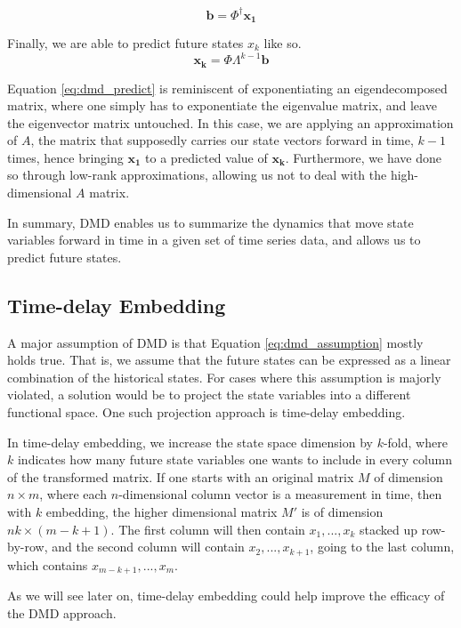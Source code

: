 \documentclass[letterpaper, 10 pt, conference]{ieeeconf}  %
\begin{document}
\begin{equation}
    \bm{b} =  \Phi^{\dagger} \bm{x_1}
\label{eq:dmd_predict}
\end{equation}

Finally, we are able to predict future states $x_k$ like so.
\begin{equation}
    \bm{x_k} =  \Phi \Lambda ^{k-1}\bm{b}
\end{equation}

Equation \ref{eq:dmd_predict} is reminiscent of exponentiating an eigendecomposed matrix, where one simply has to exponentiate the eigenvalue matrix, and leave the eigenvector matrix untouched. In this case, we are applying an approximation of $A$, the matrix that supposedly carries our state vectors forward in time, $k-1$ times, hence bringing $\bm{x_1}$ to a predicted value of $\bm{x_k}$. Furthermore, we have done so through low-rank approximations, allowing us not to deal with the high-dimensional $A$ matrix.

In summary, DMD enables us to summarize the dynamics that move state variables forward in time in a given set of time series data, and allows us to predict future states.

\subsection{Time-delay Embedding}
\label{section:time_delay}
A major assumption of DMD is that Equation \ref{eq:dmd_assumption} mostly holds true. That is, we assume that the future states can be expressed as a linear combination of the historical states. For cases where this assumption is majorly violated, a solution would be to project the state variables into a different functional space. One such projection approach is time-delay embedding.

In time-delay embedding, we increase the state space dimension by $k$-fold, where $k$ indicates how many future state variables one wants to include in every column of the transformed matrix. If one starts with an original matrix $M$ of dimension $n \times m$, where each $n$-dimensional column vector is a measurement in time, then with $k$ embedding, the higher dimensional matrix $M'$ is of dimension $nk \times (m-k+1)$. The first column will then contain $x_1, ..., x_k$ stacked up row-by-row, and the second column will contain $x_2, ..., x_{k+1}$, going to the last column, which contains $x_{m-k+1},..., x_{m}$.

As we will see later on, time-delay embedding could help improve the efficacy of the DMD approach.
\end{document}

